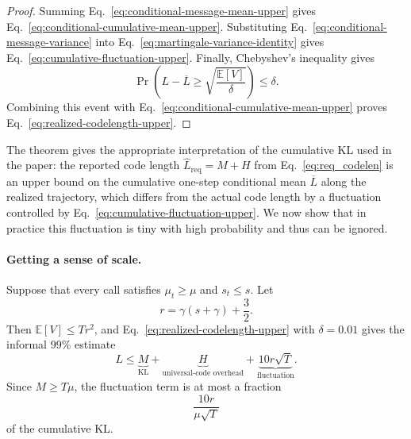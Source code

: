 \documentclass{article}
\theoremstyle{plain}
\theoremstyle{definition}
\theoremstyle{remark}
\begin{document}
\begin{proof}
Summing Eq.~\eqref{eq:conditional-message-mean-upper} gives Eq.~\eqref{eq:conditional-cumulative-mean-upper}. Substituting Eq.~\eqref{eq:conditional-message-variance} into Eq.~\eqref{eq:martingale-variance-identity} gives Eq.~\eqref{eq:cumulative-fluctuation-upper}. Finally, Chebyshev's inequality gives
\begin{equation}
    \Pr\left(
      L-\overline L
      \geq
      \sqrt{\frac{\mathbb E[V]}{\delta}}
    \right)
    \leq
    \delta.
\end{equation}
Combining this event with Eq.~\eqref{eq:conditional-cumulative-mean-upper} proves Eq.~\eqref{eq:realized-codelength-upper}.
\end{proof}

The theorem gives the appropriate interpretation of the cumulative KL used in the paper: the reported code length $\widehat{L}_\mathrm{req} = M+H$ from Eq.~\eqref{eq:req_codelen} is an upper bound on the cumulative one-step conditional mean $\overline{L}$ along the realized trajectory, which differs from the actual code length by a fluctuation controlled by Eq.~\eqref{eq:cumulative-fluctuation-upper}. We now show that in practice this fluctuation is tiny with high probability and thus can be ignored.

\paragraph{Getting a sense of scale.}
Suppose that every call satisfies $\mu_t\geq\mu$ and $s_t\leq s$. Let
\begin{equation}
    r
    =
    \gamma(s+\gamma)+\frac{3}{2}.
\end{equation}
Then $\mathbb E[V]\leq T r^2$, and Eq.~\eqref{eq:realized-codelength-upper} with $\delta=0.01$ gives the informal 99\% estimate
\begin{equation}
    L
    \leq
    \underbrace{M}_{\text{KL}}
    +
    \underbrace{H}_{\text{universal-code overhead}}
    +
    \underbrace{10r\sqrt T}_{\text{fluctuation}}.
    \label{eq:informal-99-upper}
\end{equation}
Since $M\geq T\mu$, the fluctuation term is at most a fraction
\begin{equation}
    \frac{10r}{\mu\sqrt T}
    \label{eq:informal-relative-surcharge}
\end{equation}
of the cumulative KL.
\end{document}
